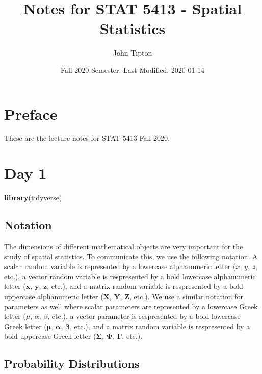 \documentclass[]{book}
\title{Notes for STAT 5413 - Spatial Statistics}
\author{John Tipton}
\date{Fall 2020 Semester. Last Modified: 2020-01-14}
\newenvironment{Shaded}{\begin{snugshade}}{\end{snugshade}}
\newcommand{\KeywordTok}[1]{\textcolor[rgb]{0.13,0.29,0.53}{\textbf{#1}}}
\newcommand{\NormalTok}[1]{#1}
\begin{document}
\maketitle

{
\setcounter{tocdepth}{1}
\tableofcontents
}
\hypertarget{preface}{%
\chapter*{Preface}\label{preface}}

These are the lecture notes for STAT 5413 Fall 2020.

\hypertarget{day-1}{%
\chapter{Day 1}\label{day-1}}

\begin{Shaded}
\begin{Highlighting}[]
\KeywordTok{library}\NormalTok{(tidyverse)}
\end{Highlighting}
\end{Shaded}

\hypertarget{notation}{%
\section{Notation}\label{notation}}

The dimensions of different mathematical objects are very important for the study of spatial statistics. To communicate this, we use the following notation. A scalar random variable is represented by a lowercase alphanumeric letter (\(x\), \(y\), \(z\), etc.), a vector random variable is respresented by a bold lowercase alphanumeric letter (\(\mathbf{x}\), \(\mathbf{y}\), \(\mathbf{z}\), etc.), and a matrix random variable is respresented by a bold uppercase alphanumeric letter (\(\mathbf{X}\), \(\mathbf{Y}\), \(\mathbf{Z}\), etc.). We use a similar notation for parameters as well where scalar parameters are represented by a lowercase Greek letter (\(\mu\), \(\alpha\), \(\beta\), etc.), a vector parameter is respresented by a bold lowercase Greek letter (\(\boldsymbol{\mu}\), \(\boldsymbol{\alpha}\), \(\boldsymbol{\beta}\), etc.), and a matrix random variable is respresented by a bold uppercase Greek letter (\(\boldsymbol{\Sigma}\), \(\boldsymbol{\Psi}\), \(\boldsymbol{\Gamma}\), etc.).

\hypertarget{probability-distributions}{%
\section{Probability Distributions}\label{probability-distributions}}
\end{document}
